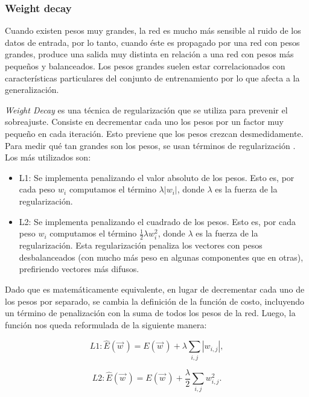 \documentclass[spanish]{report}
\begin{document}
\subsubsection{Weight decay}

Cuando existen pesos muy grandes, la red es mucho más sensible al ruido de los datos de entrada, por lo tanto, cuando éste es propagado por una red con pesos grandes, produce una salida muy distinta en relación a una red con pesos más pequeños y balanceados. Los pesos grandes suelen estar correlacionados con características particulares del conjunto de entrenamiento por lo que afecta a la generalización.

\textit{Weight Decay} \cite{Mitchell97a} es una técnica de regularización que se utiliza para prevenir el sobreajuste. Consiste en decrementar cada uno los pesos por un factor muy pequeño en cada iteración. Esto previene que los pesos crezcan desmedidamente. Para medir qué tan grandes son los pesos, se usan términos de regularización \cite{curso_stanford}. Los más utilizados son:
\newpage
\begin{itemize}
\item L1: Se implementa penalizando el valor absoluto de los pesos. Esto es, por cada peso $w_i$ computamos el término $\lambda |w_{i}|$, donde $\lambda$ es la fuerza de la regularización. 
\item L2: Se implementa penalizando el cuadrado de los pesos. Esto es, por cada peso $w_i$ computamos el término $\frac{1}{2} \lambda w_{i}^{2}$, donde $\lambda$ es la fuerza de la regularización. Esta regularización penaliza los vectores con pesos desbalanceados (con mucho más peso en algunas componentes que en otras), prefiriendo vectores más difusos.
\end{itemize}

Dado que es matemáticamente equivalente, en lugar de decrementar cada uno de los pesos por separado, se cambia la definición de la función de costo, incluyendo un término de penalización con la suma de todos los pesos de la red. Luego, la función nos queda reformulada de la siguiente manera:

\begin{equation}
L1: \hat E(\vec{w}^{\,}) = E(\vec{w}^{\,}) + \lambda\sum_{i,j}^{}{|w_{i,j}|},
\end{equation}

\begin{equation}
L2: \hat E(\vec{w}^{\,}) = E(\vec{w}^{\,}) + \frac{\lambda}{2}\sum_{i,j}^{}{w_{i,j}^{2}}.
\end{equation}
\end{document}
